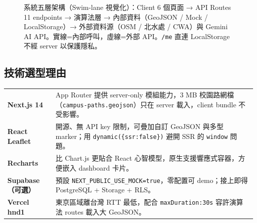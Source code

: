 \documentclass[11pt,a4paper]{article}
\begin{document}
\begin{figure}[H]
\caption{系統五層架構（Swim-lane 視覺化）：Client 6 個頁面 → API Routes 11 endpoints → 演算法層 → 內部資料（GeoJSON / Mock / LocalStorage）→ 外部資料源（OSM / 北水處 / CWA）與 Gemini AI API。實線=內部呼叫，虛線=外部 API。\texttt{/me} 直連 LocalStorage 不經 server 以保護隱私。}
\end{figure}


\subsection{技術選型理由}

\begin{techbox}
\renewcommand{\arraystretch}{1.25}
\begin{tabular}{@{}p{2.8cm}p{10cm}@{}}
\textbf{Next.js 14} & App Router 提供 server-only 模組能力，3 MB 校園路網檔（\texttt{campus-paths.geojson}）只在 server 載入，client bundle 不受影響。\\
\textbf{React Leaflet} & 開源、無 API key 限制，可疊加自訂 GeoJSON 與多型 marker；用 \texttt{dynamic(\{ssr:false\})} 避開 SSR 的 \texttt{window} 問題。\\
\textbf{Recharts} & 比 Chart.js 更貼合 React 心智模型，原生支援響應式容器，方便嵌入 dashboard 卡片。\\
\textbf{Supabase（可選）} & 預設 \texttt{NEXT\_PUBLIC\_USE\_MOCK=true}，零配置可 demo；接上即得 PostgreSQL + Storage + RLS。\\
\textbf{Vercel hnd1} & 東京區域離台灣 RTT 最低，配合 \texttt{maxDuration:30s} 容許演算法 routes 載入大 GeoJSON。\\
\end{tabular}
\end{techbox}
\end{document}
